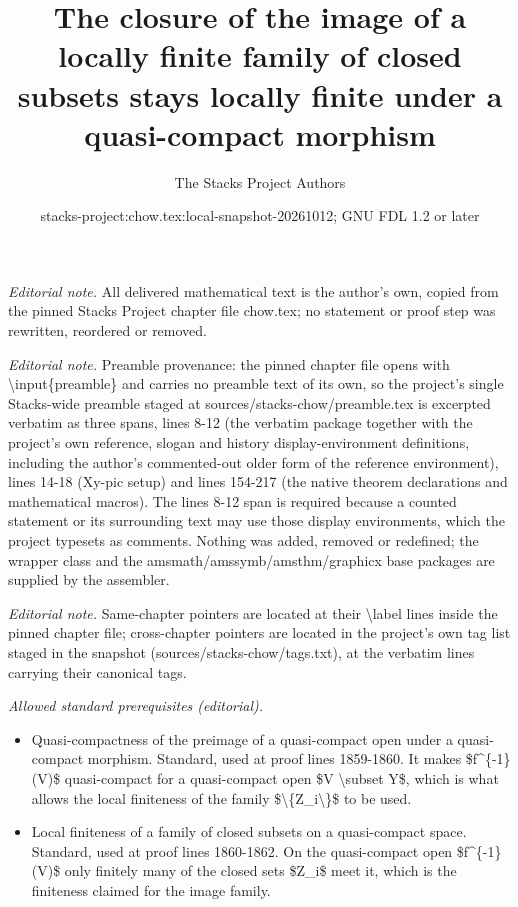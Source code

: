 \documentclass[10pt,a4paper]{amsart}
\title{The closure of the image of a locally finite family of closed subsets stays locally finite under a quasi-compact morphism}
\author{The Stacks Project Authors}
\date{stacks-project:chow.tex:local-snapshot-20261012; GNU FDL 1.2 or later}
\theoremstyle{plain}
\theoremstyle{definition}
\theoremstyle{remark}
\numberwithin{equation}{subsection}
\begin{document}
\maketitle
\noindent\textit{Editorial note.} All delivered mathematical text is the author's own, copied from the pinned Stacks Project chapter file chow.tex; no statement or proof step was rewritten, reordered or removed.\par\medskip
\noindent\textit{Editorial note.} Preamble provenance: the pinned chapter file opens with \textbackslash{}input\{preamble\} and carries no preamble text of its own, so the project's single Stacks-wide preamble staged at sources/stacks-chow/preamble.tex is excerpted verbatim as three spans, lines 8-12 (the verbatim package together with the project's own reference, slogan and history display-environment definitions, including the author's commented-out older form of the reference environment), lines 14-18 (Xy-pic setup) and lines 154-217 (the native theorem declarations and mathematical macros). The lines 8-12 span is required because a counted statement or its surrounding text may use those display environments, which the project typesets as comments. Nothing was added, removed or redefined; the wrapper class and the amsmath/amssymb/amsthm/graphicx base packages are supplied by the assembler.\par\medskip
\noindent\textit{Editorial note.} Same-chapter pointers are located at their \textbackslash{}label lines inside the pinned chapter file; cross-chapter pointers are located in the project's own tag list staged in the snapshot (sources/stacks-chow/tags.txt), at the verbatim lines carrying their canonical tags.\par\medskip
\noindent\textit{Allowed standard prerequisites (editorial).}\begin{itemize}
\item Quasi-compactness of the preimage of a quasi-compact open under a quasi-compact morphism. Standard, used at proof lines 1859-1860. It makes \$f\textasciicircum{}\{-1\}(V)\$ quasi-compact for a quasi-compact open \$V \textbackslash{}subset Y\$, which is what allows the local finiteness of the family \$\textbackslash{}\{Z\_i\textbackslash{}\}\$ to be used.
\item Local finiteness of a family of closed subsets on a quasi-compact space. Standard, used at proof lines 1860-1862. On the quasi-compact open \$f\textasciicircum{}\{-1\}(V)\$ only finitely many of the closed sets \$Z\_i\$ meet it, which is the finiteness claimed for the image family.
\end{itemize}\medskip
\end{document}

